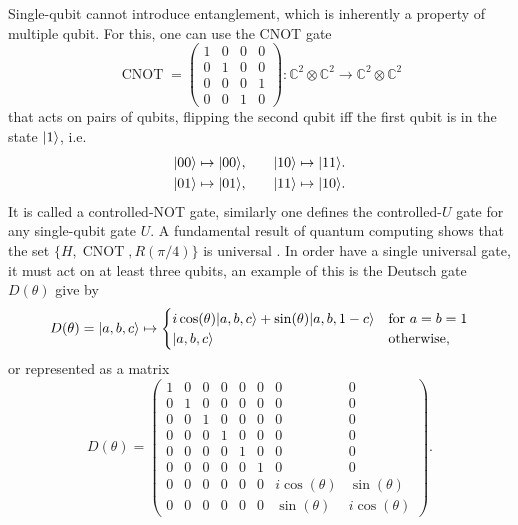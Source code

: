 Single-qubit cannot introduce entanglement, which is inherently a property of multiple qubit. For this, one can use the CNOT gate
\begin{equation}
  \operatorname{CNOT} =
  \begin{pmatrix}
    1 & 0 & 0 & 0 \\
    0 & 1 & 0 & 0 \\
    0 & 0 & 0 & 1 \\
    0 & 0 & 1 & 0
  \end{pmatrix} : \mathbb{C}^2 ⊗ \mathbb{C}^2 \to \mathbb{C}^2 ⊗ \mathbb{C}^2
\end{equation}
that acts on pairs of qubits, flipping the second qubit iff the first qubit is in the state $\lvert1\rangle$, i.e.
\begin{equation}
  \begin{aligned}
    \lvert00\rangle \mapsto \lvert00\rangle,\quad &\quad \lvert10\rangle \mapsto \lvert11\rangle. \\
    \lvert01\rangle \mapsto \lvert01\rangle,\quad &\quad \lvert11\rangle \mapsto \lvert10\rangle.
  \end{aligned}
\end{equation}
It is called a controlled-NOT gate, similarly one defines the controlled-$U$ gate for any single-qubit gate $U$. A fundamental result of quantum computing shows that the set $\{H, \operatorname{CNOT}, R(\pi/4)\}$ is universal \cite{nielsen chuang}. In order have a single universal gate, it must act on at least three qubits, an example of this is the Deutsch gate $D(\theta)$ give by
\begin{equation}
  D(\theta) = \lvert a,b,c\rangle \mapsto
  \begin{cases}
    i \cos(\theta) \lvert a,b,c\rangle + \sin(\theta) \lvert a,b,1-c\rangle & \mbox{for }a=b=1 \\
    \lvert a,b,c\rangle & \mbox{otherwise,}
  \end{cases}
\end{equation}
or represented as a matrix
\begin{equation}
  D(\theta) =
  \begin{pmatrix}
    1 & 0 & 0 & 0 & 0 & 0 & 0 & 0 \\
    0 & 1 & 0 & 0 & 0 & 0 & 0 & 0 \\
    0 & 0 & 1 & 0 & 0 & 0 & 0 & 0 \\
    0 & 0 & 0 & 1 & 0 & 0 & 0 & 0 \\
    0 & 0 & 0 & 0 & 1 & 0 & 0 & 0 \\
    0 & 0 & 0 & 0 & 0 & 1 & 0 & 0 \\
    0 & 0 & 0 & 0 & 0 & 0 & i\cos(\theta) & \sin(\theta) \\
    0 & 0 & 0 & 0 & 0 & 0 & \sin(\theta) & i\cos(\theta)
  \end{pmatrix}.
\end{equation}
